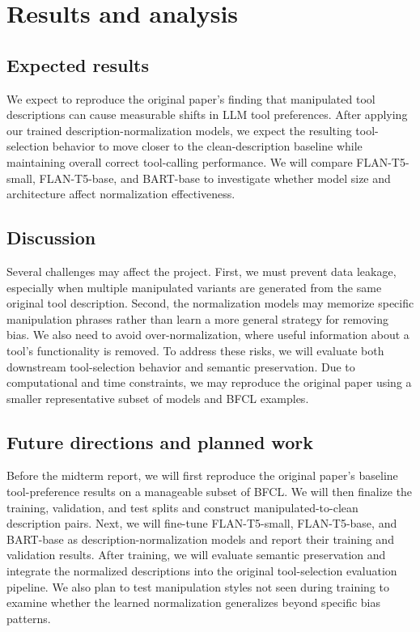 \documentclass{article}
\begin{document}
\section{Results and analysis}

\subsection{Expected results}

We expect to reproduce the original paper's finding that manipulated tool descriptions can cause measurable shifts in LLM tool preferences. After applying our trained description-normalization models, we expect the resulting tool-selection behavior to move closer to the clean-description baseline while maintaining overall correct tool-calling performance. We will compare FLAN-T5-small, FLAN-T5-base, and BART-base to investigate whether model size and architecture affect normalization effectiveness.

\subsection{Discussion}

Several challenges may affect the project. First, we must prevent data leakage, especially when multiple manipulated variants are generated from the same original tool description. Second, the normalization models may memorize specific manipulation phrases rather than learn a more general strategy for removing bias. We also need to avoid over-normalization, where useful information about a tool's functionality is removed. To address these risks, we will evaluate both downstream tool-selection behavior and semantic preservation. Due to computational and time constraints, we may reproduce the original paper using a smaller representative subset of models and BFCL examples.

\subsection{Future directions and planned work}

Before the midterm report, we will first reproduce the original paper's baseline tool-preference results on a manageable subset of BFCL. We will then finalize the training, validation, and test splits and construct manipulated-to-clean description pairs. Next, we will fine-tune FLAN-T5-small, FLAN-T5-base, and BART-base as description-normalization models and report their training and validation results. After training, we will evaluate semantic preservation and integrate the normalized descriptions into the original tool-selection evaluation pipeline. We also plan to test manipulation styles not seen during training to examine whether the learned normalization generalizes beyond specific bias patterns.
\end{document}
